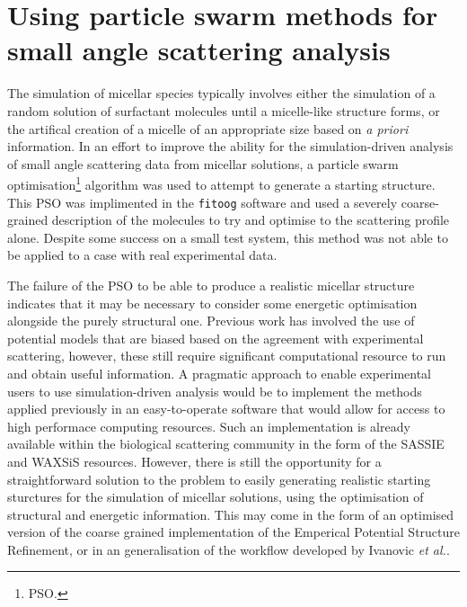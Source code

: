 \section{Using particle swarm methods for small angle scattering analysis}
The simulation of micellar species typically involves either the simulation of a random solution of surfactant molecules until a micelle-like structure forms, or the artifical creation of a micelle of an appropriate size based on \emph{a priori} information.
In an effort to improve the ability for the simulation-driven analysis of small angle scattering data from micellar solutions, a particle swarm optimisation\footnote{PSO.} algorithm was used to attempt to generate a starting structure.
This PSO was implimented in the \texttt{fitoog} software and used a severely coarse-grained description of the molecules to try and optimise to the scattering profile alone.
Despite some success on a small test system, this method was not able to be applied to a case with real experimental data.

The failure of the PSO to be able to produce a realistic micellar structure indicates that it may be necessary to consider some energetic optimisation alongside the purely structural one.
Previous work has involved the use of potential models that are biased based on the agreement with experimental scattering,\autocite{hargreaves_atomistic_2011,soper_coarse-grained_2017,ivanovic_temperature-dependent_2018} however, these still require significant computational resource to run and obtain useful information.
A pragmatic approach to enable experimental users to use simulation-driven analysis would be to implement the methods applied previously in an easy-to-operate software that would allow for access to high performace computing resources.
Such an implementation is already available within the biological scattering community in the form of the SASSIE\autocite{perkins_atomistic_2016} and WAXSiS\autocite{knight_waxsis_2015} resources.
However, there is still the opportunity for a straightforward solution to the problem to easily generating realistic starting sturctures for the simulation of micellar solutions, using the optimisation of structural and energetic information.
This may come in the form of an optimised version of the coarse grained implementation of the Emperical Potential Structure Refinement,\autocite{soper_coarse-grained_2017} or in an generalisation of the workflow developed by Ivanovic \emph{et al.}.\autocite{ivanovic_temperature-dependent_2018}

